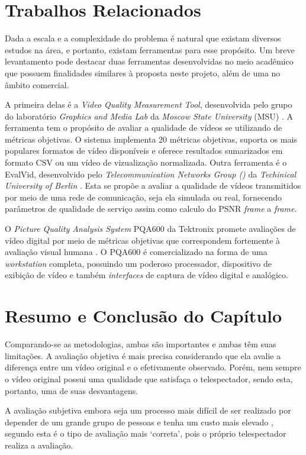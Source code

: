 \section{Trabalhos Relacionados}

Dada a escala e a complexidade do problema é natural que existam diversos estudos na área, e portanto, existam ferramentas para esse propósito. 
Um breve levantamento pode destacar duas ferramentas desenvolvidas no meio acadêmico que possuem finalidades similares à proposta neste projeto, além de uma no âmbito comercial.

A primeira delas é a  \emph{Video Quality Measurement Tool}, desenvolvida pelo grupo do laboratório \emph{Graphics and Media Lab} da \emph{Moscow State University} (MSU) \cite{moscowuniversity}.
A ferramenta tem o propósito de avaliar a qualidade de vídeos se utilizando de métricas objetivas. 
O sistema implementa 20 métricas objetivas, suporta os mais populares formatos de vídeo disponíveis e oferece resultados sumarizados em formato CSV ou um vídeo de vizualização normalizada.
Outra ferramenta é o EvalVid, desenvolvido pelo \emph{Telecommunication Networks Group ()} da \emph{Techinical University of Berlin} \cite{tuberlin}.
Esta se propõe a avaliar a qualidade de vídeos transmitidos por meio de uma rede de comunicação, seja ela simulada ou real, fornecendo parâmetros de qualidade de serviço assim como calculo do PSNR \emph{frame} a \emph{frame}.

O \emph{Picture Quality Analysis System} PQA600 da Tektronix promete avaliações de vídeo digital por meio de métricas objetivas que correspondem fortemente à avaliação visual humana \cite{tektronix}.
O PQA600 é comercializado na forma de uma \emph{workstation} completa, possuindo um poderoso processador, dispositivo de exibição de vídeo e também \emph{interfaces} de captura de vídeo digital e analógico.

\section{Resumo e Conclusão do Capítulo}

Comparando-se as metodologias, ambas são importantes e ambas têm suas limitações. A avaliação objetiva é mais precisa considerando que ela avalie a diferença entre um vídeo original e o efetivamente observado. Porém, nem sempre o vídeo original possui uma qualidade que satisfaça o telespectador, sendo esta, portanto, uma de suas desvantagens.

A avaliação subjetiva embora seja um processo mais difícil de ser realizado por depender de um grande grupo de pessoas e tenha um custo mais elevado \cite{albini}, segundo \cite{wangbovik2004} esta é o tipo de avaliação mais ‘correta’, pois o próprio telespectador realiza a avaliação.

